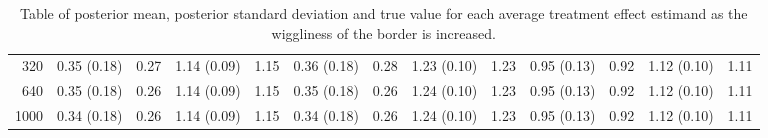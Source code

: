 \documentclass[letter]{article}
\begin{document}
\begin{landscape}
\begin{table}[!hb]
\begin{tabular}{r|rrrrrrrrrrrr}
320      & 0.35 (0.18) & 0.27    & 1.14 (0.09) & 1.15   & 0.36 (0.18) & 0.28   & 1.23 (0.10) & 1.23    & 0.95 (0.13) & 0.92   & 1.12 (0.10) & 1.11   \\
640      & 0.35 (0.18) & 0.26    & 1.14 (0.09) & 1.15   & 0.35 (0.18) & 0.26   & 1.24 (0.10) & 1.23    & 0.95 (0.13) & 0.92   & 1.12 (0.10) & 1.11   \\
1000     & 0.34 (0.18) & 0.26    & 1.14 (0.09) & 1.15   & 0.34 (0.18) & 0.26   & 1.24 (0.10) & 1.23    & 0.95 (0.13) & 0.92   & 1.12 (0.10) & 1.11  
\\    \hline
	\end{tabular}
	\caption{Table of posterior mean, posterior standard deviation and true value for each average treatment effect estimand as the wiggliness of the border is increased.}
\end{table}
\end{landscape}
\restoregeometry

    
    
	
	

    
    
\end{document}
